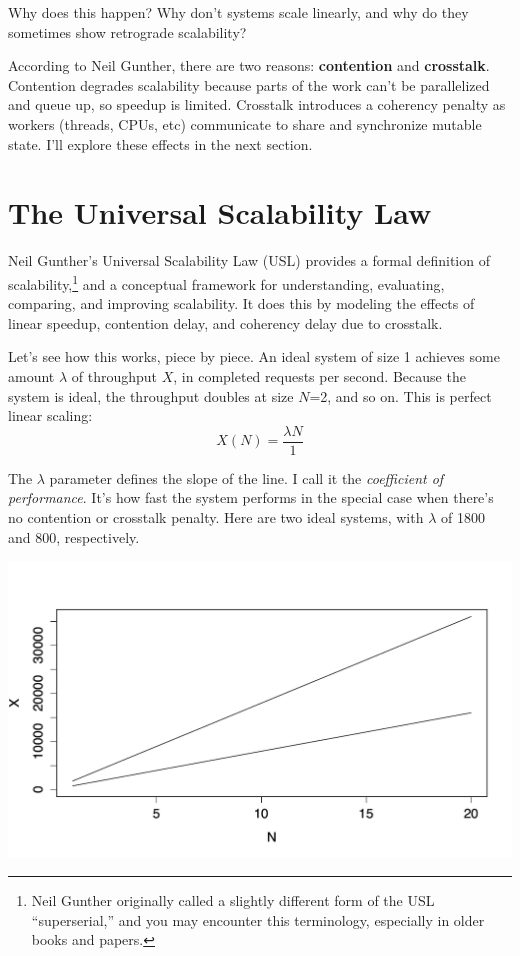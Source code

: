 \documentclass{vivid_layout}
\begin{document}
Why does this happen? Why don't systems scale linearly, and why do they
sometimes show retrograde scalability?

According to Neil Gunther, there are two reasons: {\bfseries contention} and
{\bfseries crosstalk}. Contention degrades scalability because parts of the work
can't be parallelized and queue up, so speedup is limited. Crosstalk introduces
a coherency penalty as workers (threads, CPUs, etc) communicate to share and
synchronize mutable state. I'll explore these effects in the next section.

\section{The Universal Scalability Law}

Neil Gunther's Universal Scalability Law (USL) provides a formal definition of
scalability,\footnote{Neil Gunther originally called a slightly different form
of the USL ``superserial,'' and you may encounter this terminology, especially
in older books and papers.} and a conceptual framework for understanding,
evaluating, comparing, and improving scalability. It does this by modeling
the effects of linear speedup, contention delay, and coherency delay due to
crosstalk.

Let's see how this works, piece by piece. An ideal system of size 1
achieves some amount $\lambda$ of throughput $X$, in completed requests per
second. Because the system is ideal, the throughput doubles at size $N$=2, and so
on. This is perfect linear scaling:
\begin{equation}
X(N) = \frac{\lambda N}{1}
\label{linear}
\end{equation}

The $\lambda$ parameter defines the slope of the line. I call it the {\itshape
coefficient of performance}. It's how fast the system performs in the special
case when there's no contention or crosstalk penalty.
Here are two ideal systems, with $\lambda$ of 1800 and 800, respectively.
\begin{center}
\includegraphics[width=.85\linewidth]{scalability/ideal-linear}
\end{center}
\end{document}
